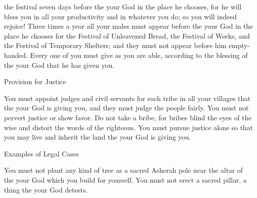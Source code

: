 {the festival seven
days
before the
{}
your God
in the place
he
chooses,
for
he
will bless
you in all
your productivity
and in whatever
you do;
so you will indeed
rejoice!
Three
times
a year
all
your males
must appear
before
the {}
your God
in the place
he chooses
for the Festival
of Unleavened
Bread, the Festival
of Weeks,
and the Festival
of Temporary Shelters;
and they must not
appear
before
him empty-handed.
Every one
of you must give
as you are able, according
to the blessing
of the {}
your God
that
he has given you.
\par }{\SH Provision for Justice
\par }{\PP {}You must appoint judges
and civil
servants for each tribe
in all
your villages
that
the {}
your God
is giving
you, and they must judge
the
people
fairly.
You must not
pervert
justice
or
show
favor. Do not
take
a bribe,
for
bribes
blind
the eyes
of the wise
and distort
the words
of the righteous.
You must
pursue
justice
alone so that you may
live
and inherit
the land
the {}
your God
is giving you.
\par }{\SH Examples of Legal Cases
\par }{\PP {}You must not
plant
any
kind of tree
as a sacred Asherah pole
near
the altar
of the {}
your God
which
you build
for yourself.
You must not
erect
a sacred pillar,
a thing the
{}
your God
detests.

}
